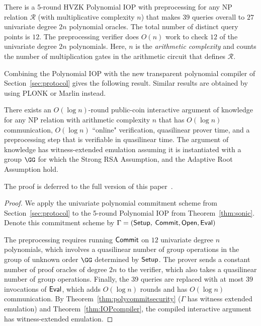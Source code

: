 \begin{theorem}\label{thm:sonic} 
There is a 5-round HVZK Polynomial IOP with preprocessing for any NP relation $\mathcal{R}$ (with multiplicative complexity $n$) that makes $39$ queries overall to $27$ univariate degree $2n$ polynomial oracles. The total number of distinct query points is $12$. The preprocessing verifier does $O(n)$ work to check $12$ of the univariate degree $2n$ polynomials. Here, $n$ is the \emph{arithmetic complexity} and counts the number of multiplication gates in the arithmetic circuit that defines $\mathcal{R}$.
\end{theorem}



Combining the  Polynomial IOP with the new transparent polynomial compiler of Section~\ref{sec:protocol} gives the following result. Similar results are obtained by using \textsf{PLONK} or \textsf{Marlin} instead.  

\begin{theorem}\label{thm:supersonic} 
There exists an $O(\log n)$-round public-coin interactive argument of knowledge for any NP relation with arithmetic complexity $n$ that has $O(\log n)$ communication, $O(\log n)$ ``online" verification, quasilinear prover time, and a preprocessing step that is verifiable in quasilinear time. The argument of knowledge has witness-extended emulation assuming it is instantiated with a group $\GG$ for which the Strong RSA Assumption, and the Adaptive Root Assumption hold. 
\end{theorem}

The proof is deferred to the full version of this paper~\cite{DARK/Supersonic:fullversion}.

\begin{proof}
We apply the univariate polynomial commitment scheme from Section~\ref{sec:protocol} to the 5-round Polynomial IOP from Theorem~\ref{thm:sonic}. Denote this commitment scheme by $\Gamma = (\textsf{{Setup}},$ $\textsf{{Commit}}, \textsf{{Open}}, \textsf{{Eval}})$ 

The preprocessing requires running $\textsf{{Commit}}$ on $12$ univariate degree $n$ polynomials, which involves a quasilinear number of group operations in the group of unknown order $\GG$ determined by $\textsf{{Setup}}$. The prover sends a constant number of proof oracles of degree $2n$ to the verifier, which also takes a quasilinear number of group operations. Finally, the 39 queries are replaced with at most $39$ invocations of $\textsf{{Eval}}$, which adds $O(\log n )$ rounds and has $O(\log n)$ communication. By Theorem~\ref{thm:polycommitsecurity} ($\Gamma$ has witness extended emulation) and Theorem~\ref{thm:IOPcompiler}, the compiled interactive argument has witness-extended emulation.
\end{proof}
\fi

